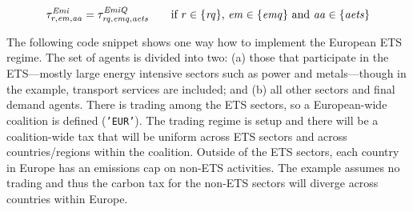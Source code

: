 \documentclass[11pt,letterpaper]{report}
\begin{document}
\begin{equation}
\label{eq:emitax}
\tau^{\mathit{Emi}}_{r,\mathit{em},\mathit{aa}} =
   \tau^{\mathit{EmiQ}}_{\mathit{rq},\mathit{emq},\mathit{aets}}
\qquad \textrm{if } r \in \{ \mathit{rq} \} \textrm{, } \mathit{em} \in \{ \mathit{emq} \} \textrm{ and } \mathit{aa} \in \{ \mathit{aets} \}\\
\end{equation}

The following code snippet shows one way how to implement the
European ETS regime.  The set of agents is divided into two: (a) those that
participate in the ETS---mostly large energy intensive sectors such as power
and metals---though in the example, transport services are included; and (b)
all other sectors and final demand agents. There is trading among the ETS
sectors, so a European-wide coalition is defined (\texttt{'EUR'}). The trading
regime is setup and there will be a coalition-wide tax that will be uniform
across ETS sectors and across countries/regions within the coalition.
Outside of the ETS sectors, each country in Europe has an
emissions cap on non-ETS activities.
The example assumes no trading and thus the carbon tax for the non-ETS sectors
will diverge across countries within Europe.
\end{document}

